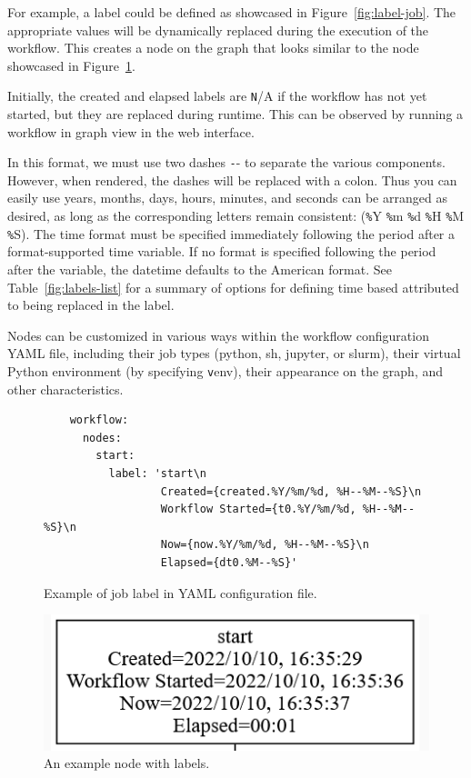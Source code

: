\documentclass[sigplan,screen]{acmart}
\begin{document}
For example, a label could be defined as showcased in
Figure~\ref{fig:label-job}. The appropriate values will be dynamically
replaced during the execution of the workflow.  This creates a node on
the graph that looks similar to the node showcased in
Figure~\ref{fig:label-node}.

Initially, the created and elapsed labels are {\scriptsize\texttt N/A}
if the workflow has not yet started, but they are replaced during
runtime. This can be observed by running a workflow in graph view in
the web interface.

In this format, we must use two dashes {\scriptsize\texttt --} to
separate the various components. However, when rendered, the dashes
will be replaced with a colon. Thus you can easily use years, months,
days, hours, minutes, and seconds can be arranged as desired, as long
as the corresponding letters remain consistent:
({\scriptsize\texttt \%Y} 
{\scriptsize\texttt \%m}
{\scriptsize\texttt \%d} 
{\scriptsize\texttt \%H} 
{\scriptsize\texttt \%M} 
{\scriptsize\texttt \%S}).
The time format must be specified immediately following the period
after a format-supported time variable.  If no format is specified
following the period after the variable, the datetime defaults to the
American format.  See Table~\ref{fig:labels-list} for a summary of
options for defining time based attributed to being replaced in the
label.


Nodes can be customized in various ways within the workflow
configuration YAML file, including their job types (python, sh,
jupyter, or slurm), their virtual Python environment (by specifying
{\scriptsize\texttt venv}), their appearance on the graph, and other
characteristics.


\begin{figure}
\smallskip
    {\scriptsize
    \begin{verbatim}
    workflow:
      nodes:
        start:
          label: 'start\n
                  Created={created.%Y/%m/%d, %H--%M--%S}\n
                  Workflow Started={t0.%Y/%m/%d, %H--%M--%S}\n
                  Now={now.%Y/%m/%d, %H--%M--%S}\n
                  Elapsed={dt0.%M--%S}'
    \end{verbatim}}
    \caption{Example of job label in YAML configuration file.}
    \label{fig:label-job}

\centering
\includegraphics[width=0.7\columnwidth]{./images/labelmaker-example.png}
\caption{An example node with labels.}\label{fig:label-node}
\end{figure}
\end{document}
